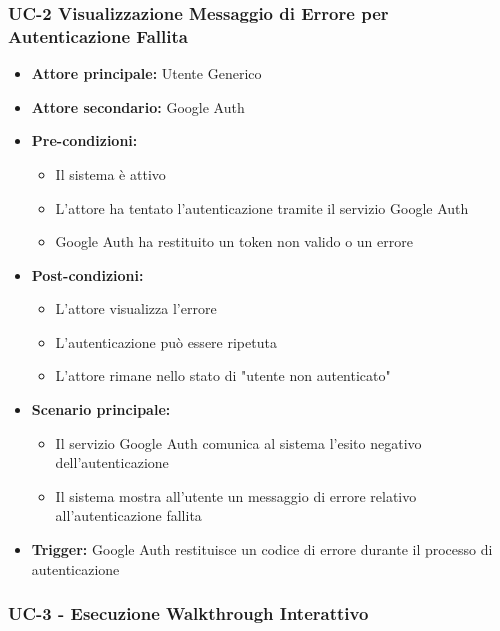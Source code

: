 \documentclass[a4paper,12pt]{article}
\begin{document}
\subsubsection{UC-2 Visualizzazione Messaggio di Errore per Autenticazione Fallita} \label{subsec:UC-2}
\begin{itemize}
    \item \textbf{Attore principale:} Utente Generico
    \item \textbf{Attore secondario:} Google Auth
    \item \textbf{Pre-condizioni:} 
    \begin{itemize}
        \item Il sistema è attivo
        \item L'attore ha tentato l'autenticazione tramite il servizio Google Auth
        \item Google Auth ha restituito un token non valido o un errore
    \end{itemize}
    \item \textbf{Post-condizioni:}
    \begin{itemize}
        \item L'attore visualizza l'errore
        \item L'autenticazione può essere ripetuta
        \item L'attore rimane nello stato di "utente non autenticato"
    \end{itemize}
    \item \textbf{Scenario principale:}
    \begin{itemize}
        \item Il servizio Google Auth comunica al sistema l’esito negativo dell’autenticazione
        \item Il sistema mostra all’utente un messaggio di errore relativo all’autenticazione fallita
    \end{itemize}
    \item \textbf{Trigger:} Google Auth restituisce un codice di errore durante il processo di autenticazione
\end{itemize}

\subsubsection{UC-3 - Esecuzione Walkthrough Interattivo} \label{subsec:UC-3}

\end{document}
